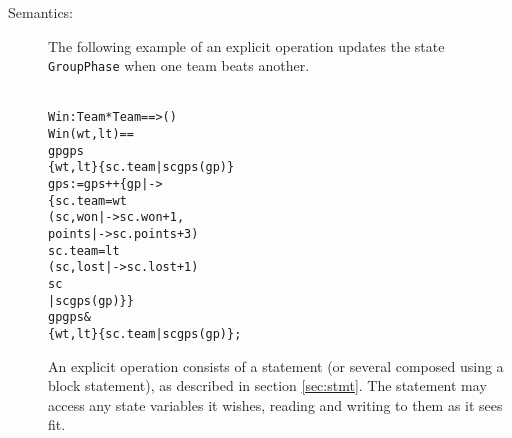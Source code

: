 \documentclass[\pformat,12pt]{article}
\begin{document}
\begin{description}










\item[Semantics:]

The following example of an explicit operation updates the 
state \texttt{GroupPhase} 
when one team beats another.
\begin{alltt}\label{winDef}
  Win : Team * Team ==> ()
  Win (wt,lt) ==
     gp  gps  
         \{wt,lt\}  \{sc.team | sc  gps(gp)\}
     gps := gps ++ \{ gp |-> 
                        \{ sc.team = wt
                         (sc, won |-> sc.won + 1,
                                     points |-> sc.points + 3)
                          sc.team = lt
                         (sc, lost |-> sc.lost + 1)
                          sc 
                    | sc  gps(gp)\}\}
      gp  gps & 
          \{wt,lt\}  \{sc.team | sc  gps(gp)\};
\end{alltt}
An explicit operation consists of a statement (or several composed
using a block statement), as described in section \ref{sec:stmt}. The 
statement may access any 
state
variables it wishes, reading and writing to them as it sees fit.


\end{description}
\end{document}
